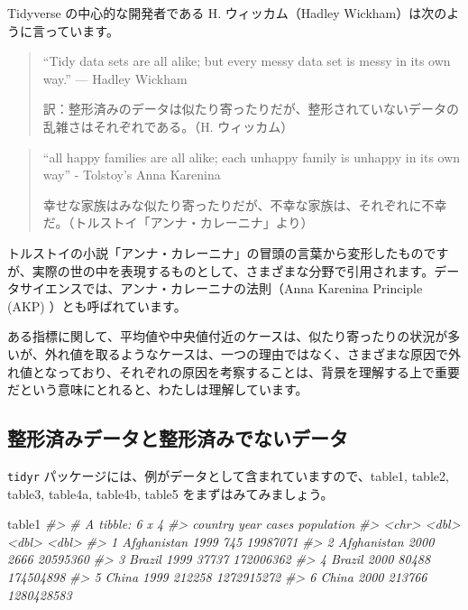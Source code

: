 \documentclass[
  xelatex, ja=standard]{bxjsbook}
\newenvironment{Shaded}{\begin{snugshade}}{\end{snugshade}}
\newcommand{\CommentTok}[1]{\textcolor[rgb]{0.56,0.35,0.01}{\textit{#1}}}
\newcommand{\NormalTok}[1]{#1}
\theoremstyle{definition}
\theoremstyle{definition}
\theoremstyle{definition}
\theoremstyle{definition}
\theoremstyle{remark}
\begin{document}
Tidyverse の中心的な開発者である H. ウィッカム（Hadley Wickham）は次のように言っています。

\begin{quote}
``Tidy data sets are all alike; but every messy data set is messy in its own way.'' --- Hadley Wickham

訳：整形済みのデータは似たり寄ったりだが、整形されていないデータの乱雑さはそれぞれである。（H. ウィッカム）
\end{quote}

\begin{quote}
``all happy families are all alike; each unhappy family is unhappy in its own way'' - Tolstoy's Anna Karenina

幸せな家族はみな似たり寄ったりだが、不幸な家族は、それぞれに不幸だ。（トルストイ「アンナ・カレーニナ」より）
\end{quote}

トルストイの小説「アンナ・カレーニナ」の冒頭の言葉から変形したものですが、実際の世の中を表現するものとして、さまざまな分野で引用されます。データサイエンスでは、アンナ・カレーニナの法則（Anna Karenina Principle (AKP) ）とも呼ばれています。

ある指標に関して、平均値や中央値付近のケースは、似たり寄ったりの状況が多いが、外れ値を取るようなケースは、一つの理由ではなく、さまざまな原因で外れ値となっており、それぞれの原因を考察することは、背景を理解する上で重要だという意味にとれると、わたしは理解しています。

\hypertarget{ux6574ux5f62ux6e08ux307fux30c7ux30fcux30bfux3068ux6574ux5f62ux6e08ux307fux3067ux306aux3044ux30c7ux30fcux30bf}{%
\subsection{整形済みデータと整形済みでないデータ}\label{ux6574ux5f62ux6e08ux307fux30c7ux30fcux30bfux3068ux6574ux5f62ux6e08ux307fux3067ux306aux3044ux30c7ux30fcux30bf}}

\texttt{tidyr} パッケージには、例がデータとして含まれていますので、table1, table2, table3, table4a, table4b, table5 をまずはみてみましょう。

\begin{Shaded}
\begin{Highlighting}[]
\NormalTok{table1}
\CommentTok{\#\textgreater{} \# A tibble: 6 x 4}
\CommentTok{\#\textgreater{}   country      year  cases population}
\CommentTok{\#\textgreater{}   \textless{}chr\textgreater{}       \textless{}dbl\textgreater{}  \textless{}dbl\textgreater{}      \textless{}dbl\textgreater{}}
\CommentTok{\#\textgreater{} 1 Afghanistan  1999    745   19987071}
\CommentTok{\#\textgreater{} 2 Afghanistan  2000   2666   20595360}
\CommentTok{\#\textgreater{} 3 Brazil       1999  37737  172006362}
\CommentTok{\#\textgreater{} 4 Brazil       2000  80488  174504898}
\CommentTok{\#\textgreater{} 5 China        1999 212258 1272915272}
\CommentTok{\#\textgreater{} 6 China        2000 213766 1280428583}
\end{Highlighting}
\end{Shaded}
\end{document}
